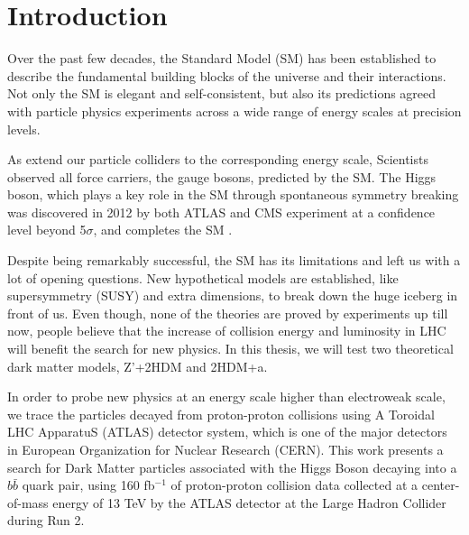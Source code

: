 \chapter{Introduction}

\label{ch:intro}
\par Over the past few decades, the Standard Model (SM) has been established to describe the fundamental building blocks of the universe and their interactions.
 Not only the SM is elegant and self-consistent, but also its predictions agreed with particle physics experiments across a wide range of energy scales at precision levels. 

\par As extend our particle colliders to the corresponding energy scale, Scientists observed all force carriers, the gauge bosons, predicted by the SM.  
The Higgs boson, which plays a key role in the SM through spontaneous symmetry breaking was discovered in 2012 by both ATLAS and CMS experiment at a confidence level beyond 5$\sigma$, and completes the SM\cite{Aad:2012tfa} \cite{Chatrchyan:2012xdj}.

\par Despite being remarkably successful, the SM has its limitations and left us with a lot  of opening questions. 
New hypothetical models are established, like supersymmetry (SUSY) and extra dimensions,
to break down the huge iceberg in front of us. Even though, none of the theories are proved by experiments up till now, 
people believe that the increase of collision energy and luminosity in LHC will benefit the search for new physics.
In this thesis, we will test two theoretical dark matter models, Z'+2HDM and 
2HDM+a. 

\par In order to probe new physics at an energy scale higher than electroweak scale,
 we trace the particles decayed from proton-proton collisions using A Toroidal LHC ApparatuS (ATLAS) detector system,
 which is one of the major detectors in European Organization for Nuclear Research (CERN). This work presents a search for Dark Matter particles associated
with the Higgs Boson decaying into a $b\bar{b}$ quark pair, using 160 fb$ ^{-1}$ of proton-proton collision data collected at a center-of-mass energy of 13 TeV
by the ATLAS detector at the Large Hadron Collider during Run 2.

